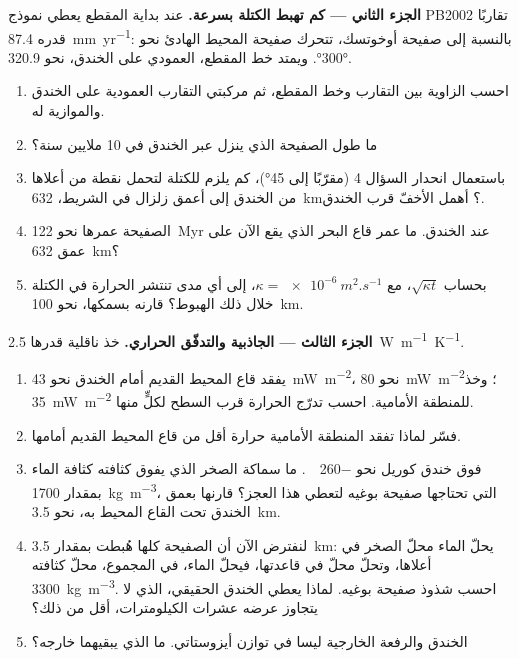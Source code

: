 \begin{problem}
\medskip
\noindent\textbf{الجزء الثاني --- كم تهبط الكتلة بسرعة.} عند بداية المقطع يعطي نموذج PB2002 تقاربًا قدره \qty{87.4}{mm.yr^{-1}}: بالنسبة إلى صفيحة أوخوتسك، تتحرك صفيحة المحيط الهادئ نحو  \ang{300}. ويمتد خط المقطع، العمودي على الخندق، نحو  \ang{320.9}.
\begin{enumerate}[resume]
  \item احسب الزاوية بين التقارب وخط المقطع، ثم مركبتي التقارب العمودية على الخندق والموازية له.
  \item ما طول الصفيحة الذي ينزل عبر الخندق في 10 ملايين سنة؟
  \item باستعمال انحدار السؤال 4 (مقرّبًا إلى \ang{45})، كم يلزم للكتلة لتحمل نقطة من أعلاها من الخندق إلى أعمق زلزال في الشريط، \qty{632}{km}؟ أهمل  الأخفّ قرب الخندق.
  \item الصفيحة عمرها نحو \qty{122}{Myr} عند الخندق. ما عمر قاع البحر الذي يقع الآن على عمق \qty{632}{km}؟
  \item بحساب $\sqrt{\kappa t}$، مع $\kappa = \qty{e-6}{m^2.s^{-1}}$، إلى أي مدى تنتشر الحرارة في الكتلة خلال ذلك الهبوط؟ قارنه بسمكها، نحو \qty{100}{km}.
\end{enumerate}

\medskip
\noindent\textbf{الجزء الثالث --- الجاذبية والتدفّق الحراري.} خذ ناقلية قدرها \qty{2.5}{W.m^{-1}.K^{-1}}.
\begin{enumerate}[resume]
  \item يفقد قاع المحيط القديم أمام الخندق نحو \qty{43}{mW.m^{-2}}،  نحو \qty{80}{mW.m^{-2}}؛ وخذ \qty{35}{mW.m^{-2}} للمنطقة الأمامية. احسب تدرّج الحرارة قرب السطح لكلٍّ منها.
  \item فسّر لماذا تفقد المنطقة الأمامية حرارة أقل من قاع المحيط القديم أمامها.
  \item {} فوق خندق كوريل نحو \qty{-260}{\milli\gal}. ما سماكة الصخر الذي يفوق كثافته كثافة الماء بمقدار \qty{1700}{kg.m^{-3}}، التي تحتاجها صفيحة بوغيه لتعطي هذا العجز؟ قارنها بعمق الخندق تحت القاع المحيط به، نحو \qty{3.5}{km}.
  \item لنفترض الآن أن الصفيحة كلها هُبطت بمقدار \qty{3.5}{km}: يحلّ الماء محلّ الصخر في أعلاها، وتحلّ  محلّ  في قاعدتها، فيحلّ الماء، في المجموع، محلّ  كثافته \qty{3300}{kg.m^{-3}}. احسب شذوذ صفيحة بوغيه. لماذا يعطي الخندق الحقيقي، الذي لا يتجاوز عرضه عشرات الكيلومترات، أقل من ذلك؟
  \item الخندق والرفعة الخارجية ليسا في توازن أيزوستاتي. ما الذي يبقيهما خارجه؟
\end{enumerate}


\end{problem}
